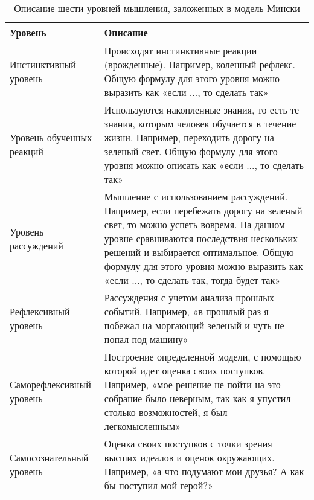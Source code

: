 \begin{table} [htbp]
  \centering
  \parbox{15cm}{\caption{Описание шести уровней мышления, заложенных в модель Мински}\label{ThinkingLevelDescription}}
  \begin{tabular}{| p{5cm} | p{11cm} |}
  
  \hline
\textbf{Уровень} & \textbf{Описание} \\
  \hline
  
Инстинктивный уровень & Происходят инстинктивные реакции (врожденные). Например, коленный рефлекс. Общую формулу для этого уровня можно выразить как «если ..., то сделать так» \\
  \hline

Уровень обученных реакций & Используются накопленные знания, то есть те знания, которым человек обучается в течение жизни. Например, переходить дорогу на зеленый свет. Общую формулу для этого уровня можно описать как «если ..., то сделать так» \\
  \hline

Уровень рассуждений & Мышление с использованием рассуждений. Например, если перебежать дорогу на зеленый свет, то можно успеть вовремя. На данном уровне сравниваются последствия нескольких решений и выбирается оптимальное. Общую формулу для этого уровня можно выразить как «если ..., то сделать так, тогда будет так» \\
  \hline

Рефлексивный уровень & Рассуждения с учетом анализа прошлых событий. Например, «в прошлый раз я побежал на моргающий зеленый и чуть не попал под машину» \\

  \hline
  Саморефлексивный уровень & Построение определенной модели, с помощью которой идет оценка своих поступков. Например, «мое решение не пойти на это собрание было неверным, так как я упустил столько возможностей, я был легкомысленным» \\
  \hline
  Самосознательный уровень & Оценка своих поступков с точки зрения высших идеалов и оценок окружающих. Например, «а что подумают мои друзья? А как бы поступил мой герой?» \\
  \hline
  
  \end{tabular}
\end{table}



